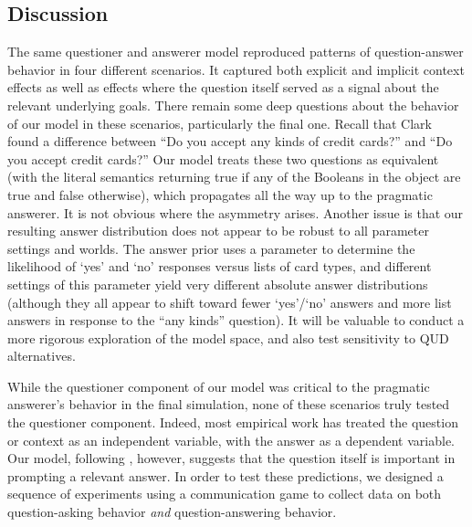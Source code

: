 \documentclass[12pt, floatsintext, jou]{apa6}
\begin{document}
\subsection{Discussion}

The same questioner and answerer model reproduced patterns of question-answer behavior in four different scenarios. It captured both explicit and implicit context effects as well as effects where the question itself served as a signal about the relevant underlying goals. 
There remain some deep questions about the behavior of our model in these scenarios, particularly the final one. Recall that Clark found a difference between ``Do you accept any kinds of credit cards?'' and ``Do you accept credit cards?'' Our model treats these two questions as equivalent (with the literal semantics returning true if any of the Booleans in the object are true and false otherwise), which propagates all the way up to the pragmatic answerer. It is not obvious where the asymmetry arises.  Another issue is that our resulting answer distribution does not appear to be robust to all parameter settings and worlds. The answer prior uses a parameter to determine the likelihood of `yes' and `no' responses versus lists of card types, and different settings of this parameter yield very different absolute answer distributions (although they all appear to shift toward fewer `yes'/`no' answers and more list answers in response to the ``any kinds'' question). It will be valuable to conduct a more rigorous exploration of the model space, and also test sensitivity to QUD alternatives. 

While the questioner component of our model was critical to the pragmatic answerer's behavior in the final simulation, none of these scenarios truly tested the questioner component.  Indeed, most empirical work has treated the question or context as an independent variable, with the answer as a dependent variable. Our model, following , however, suggests that the question itself is important in prompting a relevant answer. In order to test these predictions, we designed a sequence of experiments using a communication game to collect data on both question-asking behavior \emph{and} question-answering behavior.
\end{document}
